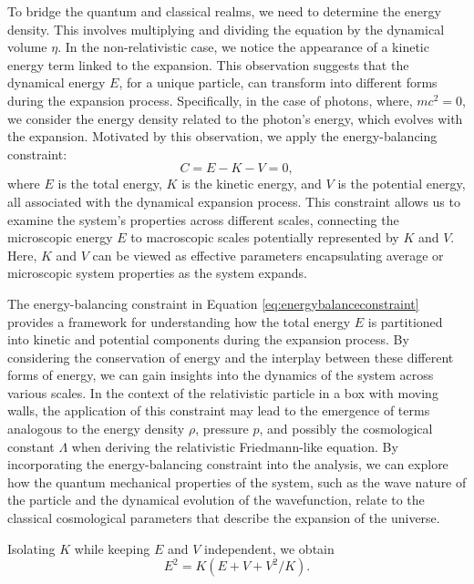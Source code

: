 \documentclass{article}
\begin{document}
To bridge the quantum and classical realms, we need to determine the energy density. This involves multiplying and dividing the equation by the dynamical volume $\eta$. In the non-relativistic case, we notice the appearance of a kinetic energy term linked to the expansion. This observation suggests that the dynamical energy $E$, for a unique particle, can transform into different forms during the expansion process. Specifically, in the case of photons, where, $mc^2=0$, we consider the energy density related to the photon's energy, which evolves with the expansion. Motivated by this observation, we apply the energy-balancing constraint:
\begin{equation}
\ensuremath{C=E-K-V=0},\label{eq:energybalanceconstraint}
\end{equation}
where $E$ is the total energy, $K$ is the kinetic energy, and $V$ is the potential energy, all associated with the dynamical expansion process. This constraint allows us to examine the system's properties across different scales, connecting the microscopic energy $E$ to macroscopic scales potentially represented by $K$ and $V$. Here, $K$ and $V$ can be viewed as effective parameters encapsulating average or microscopic system properties as the system expands.


The energy-balancing constraint in Equation \ref{eq:energybalanceconstraint} provides a framework for understanding how the total energy $E$ is partitioned into kinetic and potential components during the expansion process. By considering the conservation of energy and the interplay between these different forms of energy, we can gain insights into the dynamics of the system across various scales.
In the context of the relativistic particle in a box with moving walls, the application of this constraint may lead to the emergence of terms analogous to the energy density $\rho$, pressure $p$, and possibly the cosmological constant $\Lambda$ when deriving the relativistic Friedmann-like equation. By incorporating the energy-balancing constraint into the analysis, we can explore how the quantum mechanical properties of the system, such as the wave nature of the particle and the dynamical evolution of the wavefunction, relate to the classical cosmological parameters that describe the expansion of the universe.

Isolating $K$ while keeping $E$ and $V$ independent, we obtain 
\begin{equation}
E^{2}=K(E+V+V^{2}/K).\label{E2expanded}
\end{equation}
\end{document}
